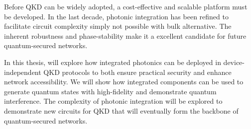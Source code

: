 Before \ac{QKD} can be widely adopted, a cost-effective and scalable platform must be developed. In the last decade, photonic integration has been refined to facilitate circuit complexity simply not possible with bulk alternative. The inherent robustness and phase-stability make it a excellent candidate for future quantum-secured networks.

In this thesis, will explore how integrated photonics can be deployed in device-independent \ac{QKD} protocols to both ensure practical security and enhance network accessibility. We will show how integrated components can be used to generate quantum states with high-fidelity and demonstrate quantum interference. The complexity of photonic integration will be explored to demonstrate new circuits for \ac{QKD} that will eventually form the backbone of quantum-secured networks.










\clearpage